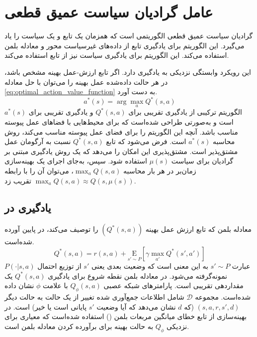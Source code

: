 \section{عامل گرادیان سیاست عمیق قطعی}\label{sec:DDPG}

گرادیان سیاست عمیق قطعی
الگوریتمی است که همزمان یک تابع  و یک سیاست را یاد می‌گیرد. این الگوريتم برای یادگیری تابع  از داده‌های غیرسیاست محور
 و معادله بلمن استفاده می‌کند. این الگوریتم برای یادگیری سیاست نیز از تابع  استفاده می‌کند.
 
 این رویکرد وابستگی نزدیکی به یادگیری  دارد. اگر تابع ارزش-عمل بهینه 
 مشخص باشد، در هر حالت داده‌شده عمل بهینه
  را می‌توان با حل
 معادله
 \eqref{eq:optimal_action_value_function}
  به دست آورد.
\begin{equation}
	\label{eq:optimal_action_value_function}
	a^*(s) = \arg \max_a Q^*(s,a)
\end{equation}
الگوریتم
ترکیبی از یادگیری تقریبی برای $ Q^*(s,a)$ و یادگیری تقریبی برای
 $a^*(s)$ 
 است و به‌صورتی طراحی شده‌است که برای محیط‌هایی با فضاهای عمل پیوسته مناسب باشد. 
    آنچه این الگوریتم را برای فضای عمل پیوسته مناسب می‌کند، 
       روش محاسبه 
    $a^*(s)$
    است.
    فرض می‌شود که تابع
     $Q^*(s,a)$
      نسبت به آرگومان عمل مشتق‌پذیر است. مشتق‌پذیری این امکان را می‌دهد که یک روش یادگیری مبتنی بر گرادیان برای سیاست
       $\mu(s)$
        استفاده شود. سپس، به‌جای اجرای یک بهینه‌سازی زمان‌بر در هر بار محاسبه
        $\max_a Q(s,a)$،
       می‌توان آن را با رابطه
        \(
        \max_a Q(s,a) \approx Q(s,\mu(s))
        \)
         تقریب زد.
         
         
\subsection{ یادگیری
در 
}
معادله بلمن که تابع ارزش عمل بهینه
 $(Q^*(s,a))$
  را توصیف می‌کند، در پایین آورده شده‌است.
\begin{equation}
	Q^*(s,a) = r(s,a) +  \underset{s' \sim P}{{\mathrm E}}\left[ \gamma \max_{a'} Q^*(s', a')\right]
\end{equation}
عبارت 
$s' \sim P$ 
به این معنی است که وضعیت بعدی یعنی $s'$ از توزیع احتمال
 $P(\cdot| s,a)$
 نمونه‌گرفته می‌شود.
 در معادله بلمن نقطه شروع برای یادگیری
  $Q^*(s,a)$
 یک مقداردهی تقریبی
   است. پارامترهای شبکه عصبی
    $Q_{\phi}(s,a)$
    با علامت
    $\phi$ 
    نشان داده شده‌است.
    مجموعه
     ${\mathcal D}$
      شامل اطلاعات  جمع‌آوری شده تغییر از یک حالت به حالت دیگر
       $(s,a,r,s',d)$
       (که $d$ نشان می‌دهد که آیا وضعیت $s'$ پایانی است یا خیر) است.
       در بهینه‌سازی از تابع خطای میانگین مربعات بلمن
        () استفاده شده‌است که معیاری برای نزدیکی
         $Q_{\phi}$
         به حالت بهینه
          برای برآورده کردن معادله بلمن است.
          
